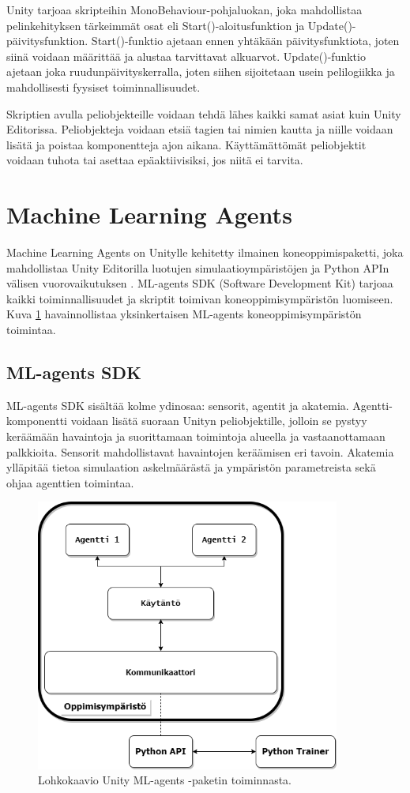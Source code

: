 \documentclass[utf8]{gradu3}
\begin{document}
Unity tarjoaa skripteihin MonoBehaviour-pohjaluokan, joka mahdollistaa pelinkehityksen tärkeimmät osat eli Start()-aloitusfunktion ja Update()-päivitysfunktion. Start()-funktio ajetaan ennen yhtäkään päivitysfunktiota, joten siinä voidaan määrittää ja alustaa tarvittavat alkuarvot. Update()-funktio ajetaan joka ruudunpäivityskerralla, joten siihen sijoitetaan usein pelilogiikka ja mahdollisesti fyysiset toiminnallisuudet.

Skriptien avulla peliobjekteille voidaan tehdä lähes kaikki samat asiat kuin Unity Editorissa. Peliobjekteja voidaan etsiä tagien tai nimien kautta ja niille voidaan lisätä ja poistaa komponentteja ajon aikana. Käyttämättömät peliobjektit voidaan tuhota tai asettaa epäaktiivisiksi, jos niitä ei tarvita.

\section{Machine Learning Agents}

Machine Learning Agents on Unitylle kehitetty ilmainen koneoppimispaketti, joka mahdollistaa Unity Editorilla luotujen simulaatioympäristöjen ja Python APIn välisen vuorovaikutuksen \parencite{juliani2018unity}. ML-agents SDK (Software Development Kit) tarjoaa kaikki toiminnallisuudet ja skriptit toimivan koneoppimisympäristön luomiseen. Kuva \ref{mlagentsstructure} havainnollistaa yksinkertaisen ML-agents koneoppimisympäristön toimintaa.

\subsection{ML-agents SDK}

ML-agents SDK sisältää kolme ydinosaa: sensorit, agentit ja akatemia. Agentti-komponentti voidaan lisätä suoraan Unityn peliobjektille, jolloin se pystyy keräämään havaintoja ja suorittamaan toimintoja alueella ja vastaanottamaan palkkioita. Sensorit mahdollistavat havaintojen keräämisen eri tavoin. Akatemia ylläpitää tietoa simulaation askelmäärästä ja ympäristön parametreista sekä ohjaa agenttien toimintaa.

\begin{figure}[h]
\centering
\includegraphics[width=10cm]{mlagents_structure.png}
\caption{Lohkokaavio Unity ML-agents -paketin toiminnasta.}
\label{mlagentsstructure}
\end{figure}
\end{document}
